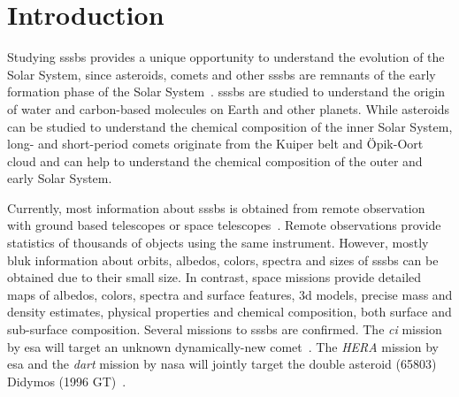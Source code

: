\section{Introduction} \label{sec:introduction}




Studying \glspl{sssb} provides a unique opportunity to understand the evolution of the Solar System, since asteroids, comets and other \glspl{sssb} are remnants of the early formation phase of the Solar System~\cite{walsh2018rubble, a2017comets}. \glspl{sssb} are studied to understand the origin of water and carbon-based molecules on Earth and other planets. While asteroids can be studied to understand the chemical composition of the inner Solar System, long- and short-period comets originate from the Kuiper belt and \"Opik-Oort cloud and can help to understand the chemical composition of the outer and early Solar System.

Currently, most information about \glspl{sssb} is obtained from remote observation with ground based telescopes or space telescopes~\cite{bowles2018castaway}. Remote observations provide statistics of thousands of objects using the same instrument. However, mostly bluk information about orbits, albedos, colors, spectra and sizes of \glspl{sssb} can be obtained due to their small size. In contrast, space missions provide detailed maps of albedos, colors, spectra and surface features, \gls{3d} models, precise mass and density estimates, physical properties and chemical composition, both surface and sub-surface composition. Several missions to \glspl{sssb} are confirmed. The \textit{\gls{ci}} mission by \gls{esa} will target an unknown dynamically-new comet~\cite{snodgrass2019europeanCI}. The \textit{HERA} mission by \gls{esa} and the \textit{\gls{dart}} mission by \gls{nasa} will jointly target the double asteroid (65803) Didymos (1996 GT)~\cite{hera, talbert_2017DART}.

